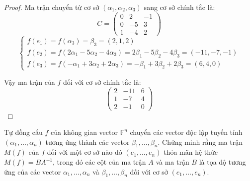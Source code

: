 \begin{proof}
    Ma trận chuyển từ cơ sở $(\alpha_{1}, \alpha_{2}, \alpha_{3})$ sang cơ sở chính tắc là:
    \[
        C =
        \begin{pmatrix}
            0 & 2  & -1 \\
            0 & -5 & 3  \\
            1 & -4 & 2
        \end{pmatrix}
    \]
    \[
        \begin{cases}
            f(e_{1}) = f(\alpha_{3}) = \beta_{3} = (2,1,2)                                                               \\
            f(e_{2}) = f(2\alpha_{1} - 5\alpha_{2} - 4\alpha_{3}) = 2\beta_{1} - 5\beta_{2} - 4\beta_{3} = (-11, -7, -1) \\
            f(e_{3}) = f(-\alpha_{1} + 3\alpha_{2} + 2\alpha_{3}) = -\beta_{1} + 3\beta_{2} + 2\beta_{3} = (6, 4, 0)
        \end{cases}
    \]
    
    Vậy ma trận của $f$ đối với cơ sở chính tắc là:
    \[
        \begin{pmatrix}
            2 & -11 & 6 \\
            1 & -7  & 4 \\
            2 & -1  & 0
        \end{pmatrix}
    \]
\end{proof}

\begin{exercise}
    Tự đồng cấu $f$ của không gian vector $\mathbb{F}^{n}$ chuyển các vector độc lập tuyến tính $(\alpha_{1}, \ldots, \alpha_{n})$ tương ứng thành các vector $\beta_{1}, \ldots, \beta_{n}$. Chứng minh rằng ma trận $M(f)$ của $f$ đối với một cơ sở nào đó $(e_{1},\ldots, e_{n})$ thỏa mãn hệ thức $M(f) = BA^{-1}$, trong đó các cột của ma trận $A$ và ma trận $B$ là tọa độ tương ứng của các vector $\alpha_{1}, \ldots, \alpha_{n}$ và $\beta_{1}, \ldots, \beta_{n}$ đối với cơ sở $(e_{1}, \ldots, e_{n})$.
\end{exercise}

